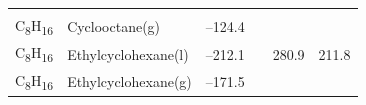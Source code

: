 \documentclass[
]{book}
\theoremstyle{definition}
\theoremstyle{definition}
\theoremstyle{definition}
\theoremstyle{remark}
\begin{document}
\begin{longtable}[]{@{}llllll@{}}
\begin{minipage}[t]{0.14\columnwidth}
\strut
\end{minipage}\tabularnewline
\begin{minipage}[t]{0.07\columnwidth}\raggedright
C\textsubscript{8}H\textsubscript{16}\strut
\end{minipage} & \begin{minipage}[t]{0.17\columnwidth}\raggedright
Cyclooctane(g)\strut
\end{minipage} & \begin{minipage}[t]{0.15\columnwidth}\raggedright
--124.4\strut
\end{minipage} & \begin{minipage}[t]{0.15\columnwidth}\raggedright
\strut
\end{minipage} & \begin{minipage}[t]{0.14\columnwidth}\raggedright
\strut
\end{minipage} & \begin{minipage}[t]{0.14\columnwidth}\raggedright
\strut
\end{minipage}\tabularnewline
\begin{minipage}[t]{0.07\columnwidth}\raggedright
C\textsubscript{8}H\textsubscript{16}\strut
\end{minipage} & \begin{minipage}[t]{0.17\columnwidth}\raggedright
Ethylcyclohexane(l)\strut
\end{minipage} & \begin{minipage}[t]{0.15\columnwidth}\raggedright
--212.1\strut
\end{minipage} & \begin{minipage}[t]{0.15\columnwidth}\raggedright
\strut
\end{minipage} & \begin{minipage}[t]{0.14\columnwidth}\raggedright
280.9\strut
\end{minipage} & \begin{minipage}[t]{0.14\columnwidth}\raggedright
211.8\strut
\end{minipage}\tabularnewline
\begin{minipage}[t]{0.07\columnwidth}\raggedright
C\textsubscript{8}H\textsubscript{16}\strut
\end{minipage} & \begin{minipage}[t]{0.17\columnwidth}\raggedright
Ethylcyclohexane(g)\strut
\end{minipage} & \begin{minipage}[t]{0.15\columnwidth}\raggedright
--171.5\strut
\end{minipage} & \begin{minipage}[t]{0.15\columnwidth}\raggedright

\end{minipage}
\end{longtable}
\end{document}
